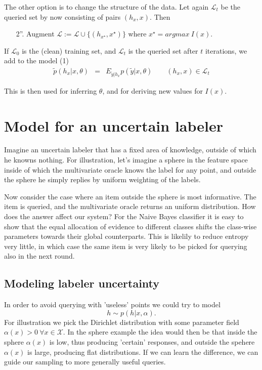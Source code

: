 \documentclass[10pt, onecolumn]{article}
\renewcommand{\L}{\mathcal{L}}
\newcommand{\newx}{{x^\star}}
\newcommand{\X}{\mathcal{X}}
\begin{document}
The other option is to change the structure of the data. Let again $\L_t$ be the queried set by now consisting of pairs $(h_x,x)$. Then 
\begin{itemize}
\item[2''.] Augment $\L:=\L\cup \{(h_\newx, \newx)\}$ where $\newx=argmax\ I(x)$.
\end{itemize} 

If $\L_0$ is the (clean) training set, and $\L_t$ is the queried set after $t$ iterations, we add to the model (1)
\begin{eqnarray}
\tilde p(h_x|x, \theta) &=& E_{\tilde y|h_x}p(\tilde y|x, \theta) \qquad (h_x, x)\in \L_t
\end{eqnarray}

This is then used for inferring $\theta$, and for deriving new  values for $I(x)$.


\section{Model for an uncertain labeler}

Imagine an uncertain labeler that has a fixed area of knowledge, outside of which he knowns nothing. For illustration, let's imagine a sphere in the feature space inside of which the multivariate oracle knows the label for any point, and outside the sphere he simply replies by uniform weighting of the labels. 

Now consider the case where an item outside the sphere is most informative. The item is queried, and the multivariate oracle returns an uniform distribution. How does the answer affect our system? For the Naive Bayes classifier it is easy to show that the  equal allocation of evidence to different classes shifts the class-wise parameters towards their global counterparts. This is likelily to reduce entropy very little, in which case the same item is very likely to be picked for querying also in the next round. 

\subsection{Modeling labeler uncertainty}
In order to avoid querying with 'useless' points we could try to model $$h\sim p(h|x, \alpha).$$ For illustration we pick the Dirichlet distribution with some parameter field $\alpha(x)>0\ \forall x\in \X$. In the sphere example the idea would then be that inside the sphere $\alpha(x)$ is low, thus producing 'certain' responses, and outside the spehere $\alpha(x)$ is large, producing flat distributions. If we can learn the difference, we can guide our sampling to more generally useful queries.
\end{document}
